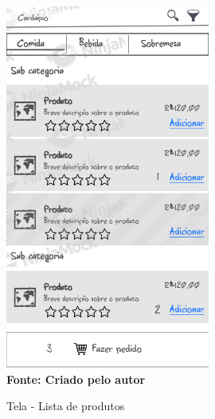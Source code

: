 \begin{figure}[ht]
	\centering	
	\caption[\hspace{0.1cm}]{Tela - Lista de produtos}
	\vspace{-0.4cm}
	\includegraphics[width=0.6\textwidth]{figuras/c_prods.png}
	 \vspace{-0.2cm}
	\\\textbf{\footnotesize Fonte: Criado pelo autor }
	\label{fig:w6}
\end{figure}
\vspace{-0.5cm}

